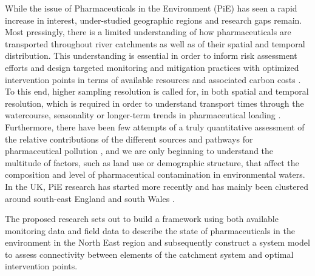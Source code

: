 \documentclass{article}
\begin{document}
While the issue of Pharmaceuticals in the Environment (PiE) has seen a rapid increase in interest, under-studied geographic regions and research gaps remain. Most pressingly, there is a limited understanding of how pharmaceuticals are transported throughout river catchments as well as of their spatial and temporal distribution. This understanding is essential in order to inform risk assessment efforts and design targeted monitoring and mitigation practices with optimized intervention points in terms of available resources and associated carbon costs \citep{Domercq2018EmissionResolution}. To this end, higher sampling resolution is called for, in both spatial and temporal resolution, which is required in order to understand transport times through the watercourse, seasonality or longer-term trends in pharmaceutical loading \citep{Burns2018TemporalSystem}. Furthermore, there have been few attempts of a truly quantitative assessment of the relative contributions of the different sources and pathways for pharmaceutical pollution \citep{Comoretto2005ComparingRiver,Kookana2014PotentialCountries}, and we are only beginning to understand the multitude of factors, such as land use or demographic structure, that affect the composition and level of pharmaceutical contamination in environmental waters. In the UK, PiE research has started more recently \citep{Ashton2004InvestigatingKingdom,Bound2006PredictedAssessment} and has mainly been clustered around south-east England and south Wales \citep{Kay2017WidespreadWaters}.

The proposed research sets out to build a framework using both available monitoring data and field data to describe the state of pharmaceuticals in the environment in the North East region and subsequently construct a system model to assess connectivity between elements of the catchment system and optimal intervention points. 


\clearpage
\end{document}
